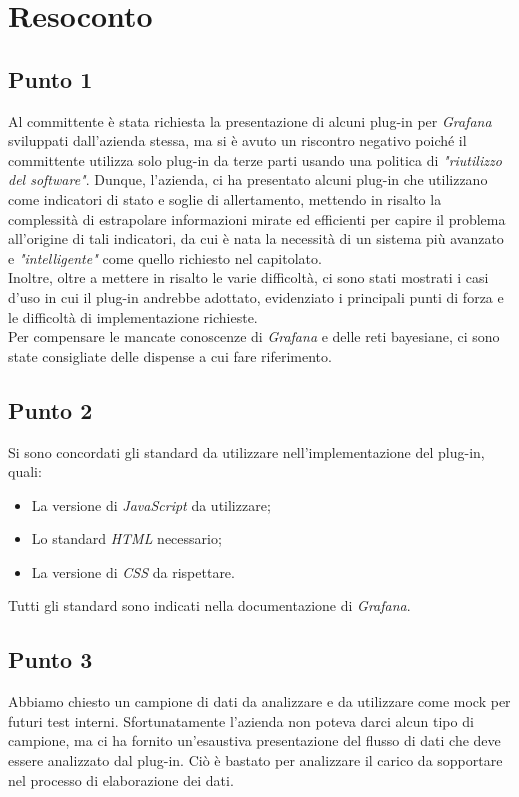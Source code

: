 \section{Resoconto}

\subsection{Punto 1}

Al committente è stata richiesta la presentazione di alcuni plug-in  per \textit{Grafana} sviluppati dall'azienda stessa, ma si è avuto un riscontro negativo poiché il committente utilizza solo plug-in da terze parti usando una politica di \textit{"riutilizzo del software"}. Dunque, l'azienda, ci ha presentato alcuni plug-in che utilizzano come indicatori di stato e soglie di allertamento, mettendo
in risalto la complessità di estrapolare informazioni mirate ed efficienti per capire il problema all'origine di tali indicatori, 
da cui è nata la necessità di un sistema più avanzato e \textit{"intelligente"} come quello richiesto nel capitolato. \\
Inoltre, oltre a mettere in risalto le varie difficoltà, ci sono stati mostrati i casi d'uso in cui il plug-in andrebbe adottato, evidenziato i principali punti di forza e le difficoltà di implementazione
richieste.\\ 
Per compensare le mancate conoscenze di \textit{Grafana} e delle reti bayesiane, ci sono state consigliate delle dispense a cui fare riferimento. 

\subsection{Punto 2}
Si sono concordati gli standard da utilizzare nell'implementazione del plug-in, quali:
\begin{itemize}
	\item La versione di \textit{JavaScript} da utilizzare; 
	\item Lo standard \textit{HTML} necessario; 
	\item La versione di \textit{CSS} da rispettare. 
\end{itemize}
Tutti gli standard sono indicati nella documentazione di \textit{Grafana}.

\subsection{Punto 3}
Abbiamo chiesto un campione di dati da analizzare e da utilizzare come mock per futuri test interni. Sfortunatamente l'azienda non poteva darci alcun tipo di campione, ma ci ha fornito 
un'esaustiva presentazione del flusso di dati che deve essere analizzato dal plug-in.
Ciò è bastato per analizzare il carico da sopportare nel processo di elaborazione dei dati. 

